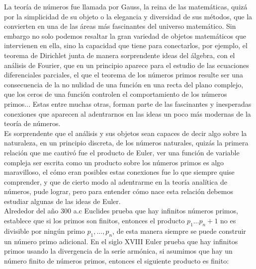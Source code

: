 
\thispagestyle{empty}
\vspace{-0.5cm}


La teoría de  números fue llamada por Gauss, la reina de las matemáticas, quizá por la simplicidad de su objeto o la elegancia y diversidad de sus métodos, que la convierten en una de las áreas más fascinantes del universo matemático. Sin embargo no solo podemos resaltar la gran variedad de objetos matemáticos que intervienen en ella, sino la capacidad que tiene para conectarlos, por ejemplo, el teorema de Dirichlet junta de manera sorprendente ideas del álgebra, con el análisis de Fourier, que  en un principio aparece para el estudio de las ecuaciones diferenciales parciales, el que el teorema de los números primos resulte ser una consecuencia de la no nulidad de una función en una recta del plano complejo, que los ceros de  una función controlen el comportamiento de los números primos... Estas entre muchas otras, forman parte de las fascinantes y inesperadas conexiones que aparecen al adentrarnos en las ideas un poco más modernas de la teoría de números.\\

Es sorprendente que el análisis y sus objetos sean capaces de decir algo sobre la naturaleza, en un principio discreta, de los números naturales, quizás la primera relación que me cautivó fue el producto de Euler, ver una función de variable compleja ser escrita como un producto sobre los números primos es algo maravilloso, el cómo eran posibles estas conexiones fue lo que siempre quise comprender, y que de cierto modo al adentrarme en la teoría analítica de números, pude  lograr, pero para entender cómo nace esta relación debemos estudiar algunas de las ideas de Euler. \\

Alrededor del año 300 a.c Euclides prueba que hay infinitos números primos, establece que si los primos son finitos, entonces el producto $p_1\ldots p_n+1$ no es divisible por ningún primo $p_1,\ldots,p_n$, de esta manera siempre se puede construir un número primo adicional. En el siglo XVIII Euler prueba que hay infinitos primos usando la divergencia de la serie armónica, si asumimos que hay un número finito de números primos, entonces el siguiente producto es finito:

